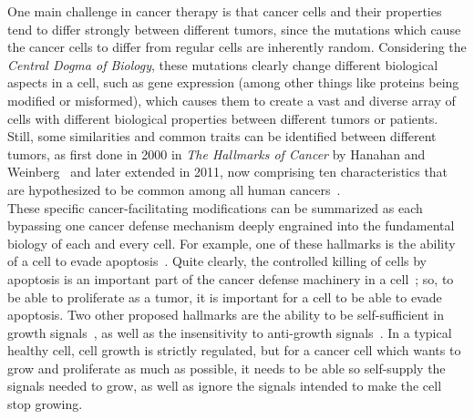 One main challenge in cancer therapy is that cancer cells and their properties tend to differ strongly between different tumors, since the mutations which cause the cancer cells to differ from regular cells are inherently random.
Considering the \emph{Central Dogma of Biology}, these mutations clearly change different biological aspects in a cell, such as gene expression (among other things like proteins being modified or misformed), which causes them to create a vast and diverse array of cells with different biological properties between different tumors or patients.\\
Still, some similarities and common traits can be identified between different tumors, as first done in 2000 in \textit{The Hallmarks of Cancer} by Hanahan and Weinberg~\cite{hallmarks-of-cancer} and later extended in 2011, now comprising ten characteristics that are hypothesized to be common among all human cancers~\cite{hallmarks-of-cancer-next-generation}.\\
These specific cancer-facilitating modifications can be summarized as each bypassing one cancer defense mechanism deeply engrained into the fundamental biology of each and every cell. For example, one of these hallmarks is the ability of a cell to evade apoptosis~\cite{hallmarks-of-cancer}. Quite clearly, the controlled killing of cells by apoptosis is an important part of the cancer defense machinery in a cell~\cite{apoptosis_in_cancer}; so, to be able to proliferate as a tumor, it is important for a cell to be able to evade apoptosis. Two other proposed hallmarks are the ability to be self-sufficient in growth signals~\cite{hallmarks-of-cancer}, as well as the insensitivity to anti-growth signals~\cite{hallmarks-of-cancer}. In a typical healthy cell, cell growth is strictly regulated, but for a cancer cell which wants to grow and proliferate as much as possible, it needs to be able so self-supply the signals needed to grow, as well as ignore the signals intended to make the cell stop growing.
